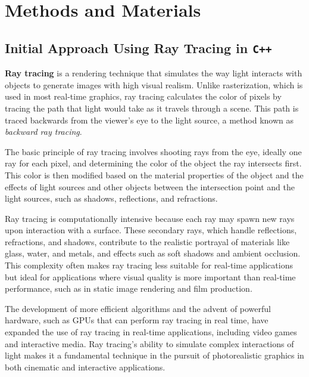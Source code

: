 \documentclass[../main.tex]{subfiles}
\begin{document}
{\let\clearpage\relax\chapter{Methods and Materials}}
\section{Initial Approach Using Ray Tracing in \texttt{C++}}
\textbf{Ray tracing} is a rendering technique that simulates the way light interacts with objects to generate images with high visual realism. Unlike rasterization, which is used in most real-time graphics, ray tracing calculates the color of pixels by tracing the path that light would take as it travels through a scene. This path is traced backwards from the viewer's eye to the light source, a method known as \textit{backward ray tracing}.

The basic principle of ray tracing involves shooting rays from the eye, ideally one ray for each pixel, and determining the color of the object the ray intersects first. This color is then modified based on the material properties of the object and the effects of light sources and other objects between the intersection point and the light sources, such as shadows, reflections, and refractions.

Ray tracing is computationally intensive because each ray may spawn new rays upon interaction with a surface. These secondary rays, which handle reflections, refractions, and shadows, contribute to the realistic portrayal of materials like glass, water, and metals, and effects such as soft shadows and ambient occlusion. This complexity often makes ray tracing less suitable for real-time applications but ideal for applications where visual quality is more important than real-time performance, such as in static image rendering and film production.

The development of more efficient algorithms and the advent of powerful hardware, such as GPUs that can perform ray tracing in real time, have expanded the use of ray tracing in real-time applications, including video games and interactive media. Ray tracing's ability to simulate complex interactions of light makes it a fundamental technique in the pursuit of photorealistic graphics in both cinematic and interactive applications.
\end{document}

